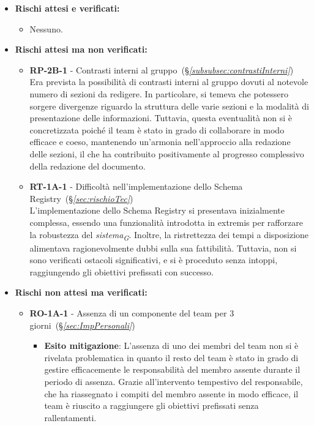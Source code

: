 \begin{itemize}
    \item \textbf{Rischi attesi e verificati:}
        \begin{itemize}
            \item Nessuno.
        \end{itemize}
    \item \textbf{Rischi attesi ma non verificati:}
        \begin{itemize}
            \item \textbf{RP-2B-1} - Contrasti interni al gruppo~(\S\textit{\ref{subsubsec:contrastiInterni}}) \\
            Era prevista la possibilità di contrasti interni al gruppo dovuti al notevole numero di sezioni da redigere. In particolare, si temeva che potessero sorgere divergenze riguardo la struttura delle varie sezioni e la modalità di presentazione delle informazioni. Tuttavia, questa eventualità non si è concretizzata poiché il team è stato in grado di collaborare in modo efficace e coeso, mantenendo un'armonia nell'approccio alla redazione delle sezioni, il che ha contribuito positivamente al progresso complessivo della redazione del documento.
            \item \textbf{RT-1A-1} - Difficoltà nell’implementazione dello Schema Registry~(\S\textit{\ref{sec:rischioTec}}) \\
            L'implementazione dello Schema Registry si presentava inizialmente complessa, essendo una funzionalità introdotta in extremis per rafforzare la robustezza del \textit{sistema}\textsubscript{\textit{G}}. Inoltre, la ristrettezza dei tempi a disposizione alimentava ragionevolmente dubbi sulla sua fattibilità. Tuttavia, non si sono verificati ostacoli significativi, e si è proceduto senza intoppi, raggiungendo gli obiettivi prefissati con successo.
        \end{itemize}
    \item \textbf{Rischi non attesi ma verificati:}
        \begin{itemize}
            \item \textbf{RO-1A-1} - Assenza di un componente del team per 3 giorni~(\S\textit{\ref{sec:ImpPersonali}})
                \begin{itemize}
                    \item \textbf{Esito mitigazione}: L'assenza di uno dei membri del team non si è rivelata problematica in quanto il resto del team è stato in grado di gestire efficacemente le responsabilità del membro assente durante il periodo di assenza. Grazie all'intervento tempestivo del responsabile, che ha riassegnato i compiti del membro assente in modo efficace, il team è riuscito a raggiungere gli obiettivi prefissati senza rallentamenti.

\end{itemize}
\end{itemize}
\end{itemize}
